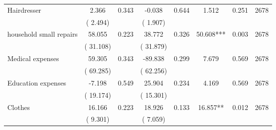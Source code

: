 \begin{tabular}{l*{7}{c}}
 Hairdresser       &              2.366       &        0.343  &             -0.038       &        0.644  &              1.512       &              0.251 &  2678 \\ 
                       &       (       2.494)             &                               &       (       1.907)                     &                               &                                               &                                &                      \\ 

 household small repairs       &             58.055       &        0.223  &             38.772       &        0.326  &             50.608***       &              0.003 &  2678 \\ 
                       &       (      31.108)             &                               &       (      31.879)                     &                               &                                               &                                &                      \\ 

 Medical expenses       &             59.305       &        0.343  &            -89.838       &        0.299  &              7.679       &              0.569 &  2678 \\ 
                       &       (      69.285)             &                               &       (      62.256)                     &                               &                                               &                                &                      \\ 

 Education expenses       &             -7.198       &        0.549  &             25.904       &        0.234  &              4.169       &              0.569 &  2678 \\ 
                       &       (      19.174)             &                               &       (      15.301)                     &                               &                                               &                                &                      \\ 

 Clothes       &             16.166       &        0.223  &             18.926       &        0.133  &             16.857**       &              0.012 &  2678 \\ 
                       &       (       9.301)             &                               &       (       7.059)                     &                               &                                               &                                &                      \\ 


\end{tabular}
